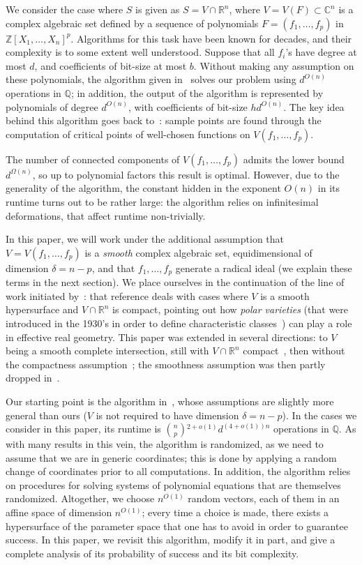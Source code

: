 \documentclass[12pt]{article}
\newcommand{\ZZ}{{\mathbb{Z}}}
\def\C{\mathbb{C}}
\def\Q{\mathbb{Q}}
\def\R{\mathbb{R}}
\begin{document}
We consider the case where $S$ is given as $S=V \cap \R^n$, where
$V=V(F) \subset \C^n$ is a complex algebraic set defined by a sequence
of polynomials $F = (f_1,\hdots,f_p)$ in
$\ZZ[X_1,\dots,X_n]^p$. Algorithms for this task have been known for
decades, and their complexity is to some extent well
understood. Suppose that all $f_i$'s have degree at most $d$, and
coefficients of bit-size at most $b$. Without making any assumption on
these polynomials, the algorithm given
in~\cite[Section~13.1]{BaPoRo03} solves our problem using $d^{O(n)}$
operations in $\Q$; in addition, the output of the algorithm is
represented by polynomials of degree $d^{O(n)}$, with coefficients of
bit-size $hd^{O(n)}$. The key idea behind this algorithm goes back
to~\cite{GrVo88}: sample points are found through the computation of
critical points of well-chosen functions on $V(f_1,\dots,f_p)$.

The number of connected components of $V(f_1,\dots,f_p)$ admits the
lower bound $d^{\Omega(n)}$, so up to polynomial factors this result
is optimal. However, due to the generality of the algorithm, the
constant hidden in the exponent $O(n)$ in its runtime turns out to be
rather large: the algorithm relies on infinitesimal deformations, that
affect runtime non-trivially.

In this paper, we will work under the additional assumption that
$V=V(f_1,\dots,f_p)$ is a {\em smooth} complex algebraic set,
equidimensional of dimension $\delta=n-p$, and that $f_1,\dots,f_p$
generate a radical ideal (we explain these terms in the next
section). We place ourselves in the continuation of the line of work
initiated by~\cite{BaGiHeMb97}: that reference deals with cases where
$V$ is a smooth hypersurface and $V \cap \R^n$ is compact, pointing
out how {\em polar varieties} (that were introduced in the 1930's in
order to define characteristic classes~\cite{Piene78,Teissier88}) can
play a role in effective real geometry. This paper was extended in
several directions: to $V$ being a smooth complete intersection, still
with $V\cap \R^n$ compact~\cite{BaGiHeMb01}, then without the
compactness assumption~\cite{EMP,BaGiHePa05}; the smoothness
assumption was then partly dropped in~\cite{BaGiHe14,BaGiHeLePa12}.

Our starting point is the algorithm in~\cite{EMP}, whose assumptions
are slightly more general than ours ($V$ is not required to have
dimension $\delta=n-p$). In the cases we consider in this paper, its
runtime is ${ n \choose p}{}^{2+o(1)}d^{(4+o(1))n}$ operations in
$\Q$.  As with many results in this vein, the algorithm is randomized,
as we need to assume that we are in generic coordinates; this is done
by applying a random change of coordinates prior to all
computations. In addition, the algorithm relies on procedures for
solving systems of polynomial equations that are themselves
randomized.  Altogether, we choose $n^{O(1)}$ random vectors, each of
them in an affine space of dimension $n^{O(1)}$; every time a choice
is made, there exists a hypersurface of the parameter space that one
has to avoid in order to guarantee success. In this paper, we revisit
this algorithm, modify it in part, and give a complete analysis of its
probability of success and its bit complexity.
\end{document}
